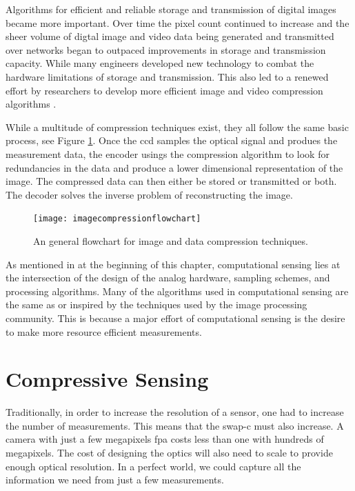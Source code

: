 Algorithms for efficient and reliable storage and transmission of digital images became more important. Over time the pixel count continued to increase and the sheer volume of digtal image and video data being generated and transmitted over networks began to outpaced improvements in storage and transmission capacity. While many engineers developed new technology to combat the hardware limitations of storage and transmission. This also led to a renewed effort by researchers to develop more efficient image and video compression algorithms \cite{kobayashi1974image, ziv1978compression}. 

While a multitude of compression techniques exist, they all follow the same basic process, see Figure \ref{fig:imagecompressionflowchart}. Once the \gls{ccd} samples the optical signal and produes the measurement data, the encoder usings the compression algorithm to look for redundancies in the data and produce a lower dimensional representation of the image. The compressed data can then either be stored or transmitted or both. The decoder solves the inverse problem of reconstructing the image. 

\begin{figure}
    \centering
    \texttt{[image: imagecompressionflowchart]}
    \caption{An general flowchart for image and data compression techniques.}
    \label{fig:imagecompressionflowchart}
\end{figure}

As mentioned in at the beginning of this chapter, computational sensing lies at the intersection of the design of the analog hardware, sampling schemes, and processing algorithms. Many of the algorithms used in computational sensing are the same as or inspired by the techniques used by the image processing community. This is because a major effort of computational sensing is the desire to make more resource efficient measurements. 

\section{Compressive Sensing}\label{sec:multiplexingtocompressivesensing}

Traditionally, in order to increase the resolution of a sensor, one had to increase the number of measurements. This means that the \gls{swap-c} must also increase. A camera with just a few megapixels \gls{fpa} costs less than one with hundreds of megapixels. The cost of designing the optics will also need to scale to provide enough optical resolution. In a perfect world, we could capture all the information we need from just a few measurements.

